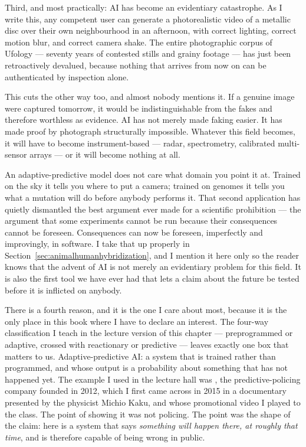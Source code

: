 Third, and most practically: AI has become an evidentiary catastrophe. As I write this,
any competent user can generate a photorealistic video of a metallic disc over their
own neighbourhood in an afternoon, with correct lighting, correct motion blur, and
correct camera shake. The entire photographic corpus of Ufology --- seventy years of
contested stills and grainy footage --- has just been retroactively devalued, because
nothing that arrives from now on can be authenticated by inspection alone.

\begin{funfact}
This cuts the other way too, and almost nobody mentions it. If a genuine image were
captured tomorrow, it would be indistinguishable from the fakes and therefore worthless
as evidence. AI has not merely made faking easier. It has made proof by photograph
structurally impossible. Whatever this field becomes, it will have to become
instrument-based --- radar, spectrometry, calibrated multi-sensor arrays --- or it will
become nothing at all.
\end{funfact}

An adaptive-predictive model does not care what domain you point it at. Trained on the sky it tells
you where to put a camera; trained on genomes it tells you what a mutation will do before anybody
performs it. That second application has quietly dismantled the best argument ever made for a
scientific prohibition --- the argument that some experiments cannot be run because their
consequences cannot be foreseen. Consequences can now be foreseen, imperfectly and improvingly, in
software. I take that up properly in Section~\ref{sec:animalhumanhybridization}, and I mention it
here only so the reader knows that the advent of AI is not merely an evidentiary problem for this
field. It is also the first tool we have ever had that lets a claim about the future be tested
before it is inflicted on anybody.

There is a fourth reason, and it is the one I care about most, because it is the only place
in this book where I have to declare an interest. The four-way classification I teach in the
lecture version of this chapter --- preprogrammed or adaptive, crossed with reactionary or
predictive --- leaves exactly one box that matters to us. Adaptive-predictive AI: a system
that is trained rather than programmed, and whose output is a probability about something
that has not happened yet. The example I used in the lecture hall was , the
predictive-policing company founded in 2012, which I first came across in 2015 in a
documentary presented by the physicist Michio Kaku, and whose promotional video I played to
the class. The point of showing it was not policing. The point was the shape of the claim:
here is a system that says \emph{something will happen there, at roughly that time}, and is
therefore capable of being wrong in public.

